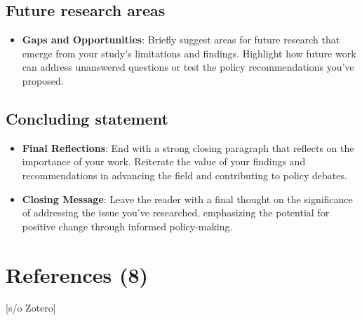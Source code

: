 \documentclass[
  12pt,
]{article}
\providecommand{\tightlist}{%
  \setlength{\itemsep}{0pt}\setlength{\parskip}{0pt}}\usepackage{longtable,booktabs,array}
\begin{document}
\subsection{Future research areas}\label{future-research-areas}

\begin{itemize}
\tightlist
\item
  \textbf{Gaps and Opportunities}: Briefly suggest areas for future
  research that emerge from your study's limitations and findings.
  Highlight how future work can address unanswered questions or test the
  policy recommendations you've proposed.
\end{itemize}

\subsection{Concluding statement}\label{concluding-statement}

\begin{itemize}
\item
  \textbf{Final Reflections}: End with a strong closing paragraph that
  reflects on the importance of your work. Reiterate the value of your
  findings and recommendations in advancing the field and contributing
  to policy debates.
\item
  \textbf{Closing Message}: Leave the reader with a final thought on the
  significance of addressing the issue you've researched, emphasizing
  the potential for positive change through informed policy-making.
\end{itemize}

\section{References (8)}\label{references-8}

{[}s/o Zotero{]}
\end{document}
